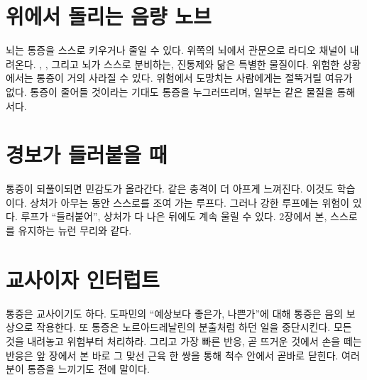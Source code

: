 \section*{위에서 돌리는 음량 노브}

뇌는 통증을 스스로 키우거나 줄일 수 있다. 위쪽의 뇌에서 관문으로 라디오 채널이 내려온다. , , 그리고 뇌가 스스로 분비하는, 진통제와 닮은 특별한 물질이다. 위험한 상황에서는 통증이 거의 사라질 수 있다. 위험에서 도망치는 사람에게는 절뚝거릴 여유가 없다. 통증이 줄어들 것이라는 기대도 통증을 누그러뜨리며, 일부는 같은 물질을 통해서다.

\section*{경보가 들러붙을 때}

통증이 되풀이되면 민감도가 올라간다. 같은 충격이 더 아프게 느껴진다. 이것도 학습이다. 상처가 아무는 동안 스스로를 조여 가는 루프다. 그러나 강한 루프에는 위험이 있다. 루프가 “들러붙어”, 상처가 다 나은 뒤에도 계속 울릴 수 있다. 2장에서 본, 스스로를 유지하는 뉴런 무리와 같다.

\section*{교사이자 인터럽트}

통증은 교사이기도 하다. 도파민의 “예상보다 좋은가, 나쁜가”에 대해 통증은 음의 보상으로 작용한다. 또 통증은 노르아드레날린의 분출처럼 하던 일을 중단시킨다. 모든 것을 내려놓고 위험부터 처리하라. 그리고 가장 빠른 반응, 곧 뜨거운 것에서 손을 떼는 반응은 앞 장에서 본 바로 그 맞선 근육 한 쌍을 통해 척수 안에서 곧바로 닫힌다. 여러분이 통증을 느끼기도 전에 말이다.

